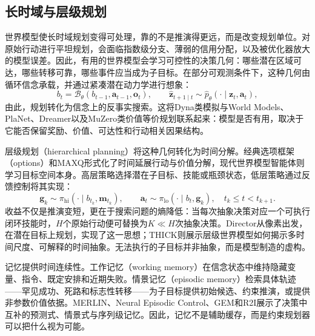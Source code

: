 \subsection{长时域与层级规划}
世界模型使长时域规划变得可处理，靠的不是推演得更远，而是改变规划单位。对原始行动进行平坦规划，会面临指数级分支、薄弱的信用分配，以及被优化器放大的模型误差。因此，有用的世界模型会学习可控性的决策几何：哪些潜在区域可达，哪些转移可靠，哪些事件应当成为子目标。在部分可观测条件下，这种几何由循环信念承载，并通过紧凑潜在动力学进行想象：
\begin{equation}
    b_t
    =
    \mathcal{B}_\theta(b_{t-1},\mathbf{a}_{t-1},\mathbf{o}_t),
    \qquad
    \widehat{\mathbf{z}}_{t+1\mid t}
    \sim
    \widehat p_\theta(\cdot\mid \mathbf{z}_t,\mathbf{a}_t),
    \label{eq:belief-world-model}
\end{equation}
由此，规划转化为信念上的反事实搜索。这将Dyna类模拟与World Models、PlaNet、Dreamer以及MuZero类价值等价规划联系起来：模型是否有用，取决于它能否保留奖励、价值、可达性和行动相关因果结构\citep{sutton1991dyna,ha2018worldmodels,hafner2019planet,hafner2019dreamer,Schrittwieser2020}。

层级规划（hierarchical planning）将这种几何转化为时间分解。经典选项框架（options）和MAXQ形式化了时间延展行动与价值分解，现代世界模型智能体则学习目标空间本身\citep{sutton1999between,dietterich2000maxq}。高层策略选择潜在子目标、技能或瓶颈状态，低层策略通过反馈控制将其实现：
\begin{equation}
    \mathbf{g}_k
    \sim
    \pi_{\mathrm{hi}}(\cdot\mid b_{t_k},\mathbf{m}_{t_k}),
    \qquad
    \mathbf{a}_t
    \sim
    \pi_{\mathrm{lo}}(\cdot\mid b_t,\mathbf{g}_k),
    \quad
    t_k\le t<t_{k+1}.
    \label{eq:hierarchical-policy}
\end{equation}
收益不仅是推演变短，更在于搜索问题的熵降低：当每次抽象决策对应一个可执行闭环技能时，$H$个原始行动便可替换为$K\ll H$次抽象决策。Director从像素出发，在潜在目标上规划，实现了这一思想；THICK则展示层级世界模型如何揭示多时间尺度、可解释的时间抽象\citep{hafner2022director,gumbsch2024learning}。无法执行的子目标并非抽象，而是模型制造的虚构。

记忆提供时间连续性。工作记忆（working memory）在信念状态中维持隐藏变量、指令、既定安排和近期失败。情景记忆（episodic memory）检索具体轨迹——罕见成功、死路和标志性转移——为子目标提供初始候选、约束推演，或提供非参数价值依据。MERLIN、Neural Episodic Control、GEM和R2I展示了决策中互补的预测式、情景式与序列级记忆\citep{wayne2018merlin,pritzel2017neural,hu2021gem,samsami2024mastering}。因此，记忆不是辅助缓存，而是约束规划器可以把什么视为可能。

